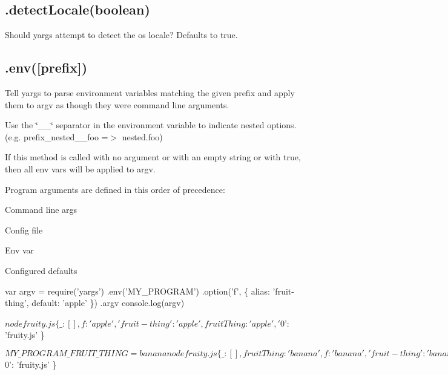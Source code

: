 \subsection*{.detect\+Locale(boolean) }

Should yargs attempt to detect the os\textquotesingle{} locale? Defaults to {\ttfamily true}.

\subsection*{.env(\mbox{[}prefix\mbox{]}) }

Tell yargs to parse environment variables matching the given prefix and apply them to argv as though they were command line arguments.

Use the \char`\"{}\+\_\+\+\_\+\char`\"{} separator in the environment variable to indicate nested options. (e.\+g. prefix\+\_\+nested\+\_\+\+\_\+foo =$>$ nested.\+foo)

If this method is called with no argument or with an empty string or with {\ttfamily true}, then all env vars will be applied to argv.

Program arguments are defined in this order of precedence\+:


\begin{DoxyEnumerate}
\item Command line args
\item Config file
\item Env var
\item Configured defaults
\end{DoxyEnumerate}


\begin{DoxyCode}
var argv = require('yargs')
  .env('MY\_PROGRAM')
  .option('f', \{
    alias: 'fruit-thing',
    default: 'apple'
  \})
  .argv
console.log(argv)
\end{DoxyCode}



\begin{DoxyCode}
$ node fruity.js
\{ \_: [],
  f: 'apple',
  'fruit-thing': 'apple',
  fruitThing: 'apple',
  '$0': 'fruity.js' \}
\end{DoxyCode}



\begin{DoxyCode}
$ MY\_PROGRAM\_FRUIT\_THING=banana node fruity.js
\{ \_: [],
  fruitThing: 'banana',
  f: 'banana',
  'fruit-thing': 'banana',
  '$0': 'fruity.js' \}
\end{DoxyCode}



